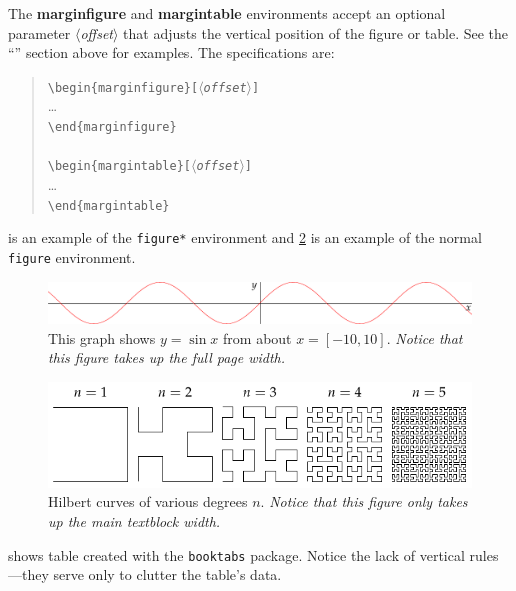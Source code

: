 \documentclass[a4paper]{tufte-handout}
\newcommand{\doccmd}[1]{\texttt{\textbackslash#1}}
\newcommand{\docopt}[1]{\ensuremath{\langle}\textrm{\textit{#1}}\ensuremath{\rangle}}
\newcommand{\docenv}[1]{\textrm{\textbf{#1}}}
\newcommand{\docpkg}[1]{\texttt{#1}}
\newenvironment{docspec}{\begin{quote}\noindent}{\end{quote}}
\begin{document}
The \docenv{marginfigure} and \docenv{margintable} environments accept an
optional parameter \docopt{offset} that adjusts the vertical position of the
figure or table. See the ``'' section above for examples.
The specifications are:
\begin{docspec}
  \doccmd{begin\{marginfigure\}[\docopt{offset}]}\\
  \qquad\ldots\\
  \doccmd{end\{marginfigure\}}\\
  \mbox{}\\
  \doccmd{begin\{margintable\}[\docopt{offset}]}\\
  \qquad\ldots\\
  \doccmd{end\{margintable\}}\\
\end{docspec}

 is an example of the \Verb|figure*|
environment and \cref{fig:textfig} is an example of the normal
\Verb|figure| environment.

\begin{figure}[h]
  \includegraphics[width=\linewidth]{sine.pdf}%
  \caption{This graph shows $y = \sin x$ from about $x = [-10, 10]$.
  \emph{Notice that this figure takes up the full page width.}}%
  \label{fig:fullfig}%
\end{figure}

\begin{figure}
  \includegraphics{hilbert-curves.pdf}
  \caption{Hilbert curves of various degrees $n$.
  \emph{Notice that this figure only takes up the main textblock width.}}
  \label{fig:textfig}
\end{figure}

 shows table created with the \docpkg{booktabs}
package. Notice the lack of vertical rules---they serve only to clutter
the table's data.
\end{document}
